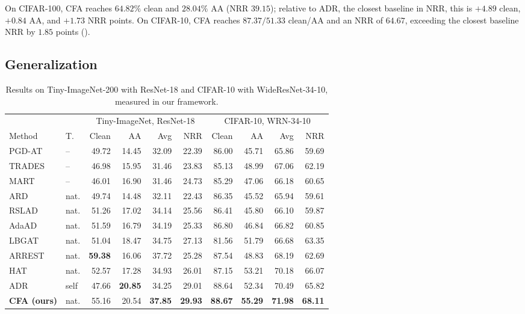 \documentclass{article} %
\theoremstyle{plain}
\begin{document}
On CIFAR-100, CFA reaches \(64.82\%\) clean and \(28.04\%\) AA (NRR
\(39.15\)); relative to ADR, the closest baseline in NRR, this is
\(+4.89\) clean, \(+0.84\) AA, and \(+1.73\) NRR points. On CIFAR-10, CFA
reaches \(87.37/51.33\) clean/AA and an NRR of \(64.67\), exceeding the
closest baseline NRR by \(1.85\) points ().

\subsection{Generalization}
\begin{table}[!htbp]
  \centering
  \footnotesize
  \setlength{\tabcolsep}{3.2pt}
  \caption{
  Results on Tiny-ImageNet-200 with ResNet-18 and CIFAR-10 with
  WideResNet-34-10, measured in our framework.
  }
  \label{tab:scale}
  \begin{tabular}{llrrrrrrrr}
    \toprule
    & & \multicolumn{4}{c}{Tiny-ImageNet, ResNet-18}
      & \multicolumn{4}{c}{CIFAR-10, WRN-34-10} \\
    \cmidrule(lr){3-6}\cmidrule(lr){7-10}
    Method & T. & Clean & AA & Avg & NRR
           & Clean & AA & Avg & NRR \\
    \midrule
    PGD-AT & -- & 49.72 & 14.45 & 32.09 & 22.39
                 & 86.00 & 45.71 & 65.86 & 59.69 \\
    TRADES & -- & 46.98 & 15.95 & 31.46 & 23.83
                 & 85.13 & 48.99 & 67.06 & 62.19 \\
    MART & -- & 46.01 & 16.90 & 31.46 & 24.73
               & 85.29 & 47.06 & 66.18 & 60.65 \\
    \midrule
    ARD & nat. & 49.74 & 14.48 & 32.11 & 22.43
               & 86.35 & 45.52 & 65.94 & 59.61 \\
    RSLAD & nat. & 51.26 & 17.02 & 34.14 & 25.56
                 & 86.41 & 45.80 & 66.10 & 59.87 \\
    AdaAD & nat. & 51.59 & 16.79 & 34.19 & 25.33
                 & 86.80 & 46.84 & 66.82 & 60.85 \\
    LBGAT & nat. & 51.04 & 18.47 & 34.75 & 27.13
                 & 81.56 & 51.79 & 66.68 & 63.35 \\
    ARREST & nat. & \textbf{59.38} & 16.06 & 37.72 & 25.28
                  & 87.54 & 48.83 & 68.19 & 62.69 \\
    HAT & nat. & 52.57 & 17.28 & 34.93 & 26.01
               & 87.15 & 53.21 & 70.18 & 66.07 \\
    ADR & self & 47.66 & \textbf{20.85} & 34.25 & 29.01
               & 88.64 & 52.34 & 70.49 & 65.82 \\
    \midrule
    \textbf{CFA (ours)}
      & nat.
      & 55.16 & 20.54 & \textbf{37.85} & \textbf{29.93}
      & \textbf{88.67} & \textbf{55.29}
      & \textbf{71.98} & \textbf{68.11} \\
    \bottomrule
  \end{tabular}
\end{table}
\end{document}
